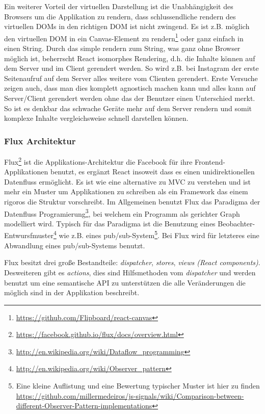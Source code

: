 \documentclass[12pt,twoside]{book}
\begin{document}
Ein weiterer Vorteil der virtuellen Darstellung ist die Unabhängigkeit des Browsers um die Applikation zu rendern, dass schlussendliche rendern des virtuellen DOMs in den richtigen DOM ist nicht zwingend. Es ist z.B. möglich den virtuellen DOM in ein Canvas-Element zu rendern\footnote{\url{https://github.com/Flipboard/react-canvas}} oder ganz einfach in einen String. Durch das simple rendern zum String, was ganz ohne Browser möglich ist, beherrscht React isomorphes Rendering, d.h. die Inhalte können auf dem Server und im Client gerendert werden. So wird z.B. bei Instagram der erste Seitenaufruf auf dem Server alles weitere vom Clienten gerendert. Erste Versuche zeigen auch, dass man dies komplett agnostisch machen kann und alles kann auf Server/Client gerendert werden ohne das der Benutzer einen Unterschied merkt. So ist es denkbar das schwache Geräte mehr auf dem Server rendern und somit komplexe Inhalte vergleichsweise schnell darstellen können.

\subsubsection{Flux Architektur}

Flux\footnote{\url{https://facebook.github.io/flux/docs/overview.html}} ist die Applikations-Architektur die Facebook für ihre Frontend-Applikationen benutzt, es ergänzt React insoweit dass es einen unidirektionellen Datenfluss ermöglicht. Es ist wie eine alternative zu MVC zu verstehen und ist mehr ein Muster um Applikationen zu schreiben als ein Framework das einem rigoros die Struktur vorschreibt. Im Allgemeinen benutzt Flux das Paradigma der Datenfluss Programierung\footnote{\url{http://en.wikipedia.org/wiki/Dataflow_programming}}, bei welchem ein Programm als gerichter Graph modelliert wird. Typisch für das Paradigma ist die Benutzung eines Beobachter-Entwursfmuster\footnote{\url{http://en.wikipedia.org/wiki/Observer_pattern}} wie z.B. eines pub/sub-System\footnote{Eine kleine Auflistung und eine Bewertung typischer Muster ist hier zu finden \url{https://github.com/millermedeiros/js-signals/wiki/Comparison-between-different-Observer-Pattern-implementations}}. Bei Flux wird für letzteres eine Abwandlung eines pub/sub-Systems benutzt.

Flux besitzt drei große Bestandteile: \textit{dispatcher}, \textit{stores}, \textit{views (React components)}. Desweiteren gibt es \textit{actions}, dies sind Hilfsmethoden vom \textit{dispatcher} und werden benutzt um eine semantische API zu unterstützen die alle Veränderungen die möglich sind in der Applikation beschreibt.
\end{document}
